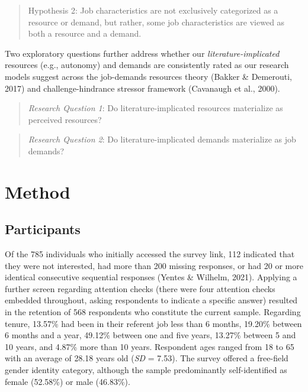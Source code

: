 \documentclass[
  man,mask]{apa6}
\begin{document}
\begin{quote}
Hypothesis 2: Job characteristics are not exclusively categorized as a resource or demand, but rather, some job characteristics are viewed as both a resource and a demand.
\end{quote}

Two exploratory questions further address whether our \emph{literature-implicated} resources (e.g., autonomy) and demands are consistently rated as our research models suggest across the job-demands resources theory (Bakker \& Demerouti, 2017) and challenge-hindrance stressor framework (Cavanaugh et al., 2000).

\begin{quote}
\emph{Research Question 1}: Do literature-implicated resources materialize as perceived resources?
\end{quote}

\begin{quote}
\emph{Research Question 2}: Do literature-implicated demands materialize as job demands?
\end{quote}

\hypertarget{method}{%
\section{Method}\label{method}}

\hypertarget{participants}{%
\subsection{Participants}\label{participants}}

Of the 785 individuals who initially accessed the survey link, 112 indicated that they were not interested, had more than 200 missing responses, or had 20 or more identical consecutive sequential responses (Yentes \& Wilhelm, 2021). Applying a further screen regarding attention checks (there were four attention checks embedded throughout, asking respondents to indicate a specific answer) resulted in the retention of 568 respondents who constitute the current sample. Regarding tenure, 13.57\% had been in their referent job less than 6 months, 19.20\% between 6 months and a year, 49.12\% between one and five years, 13.27\% between 5 and 10 years, and 4.87\% more than 10 years. Respondent ages ranged from 18 to 65 with an average of 28.18 years old (\emph{SD} = 7.53). The survey offered a free-field gender identity category, although the sample predominantly self-identified as female (52.58\%) or male (46.83\%).
\end{document}
